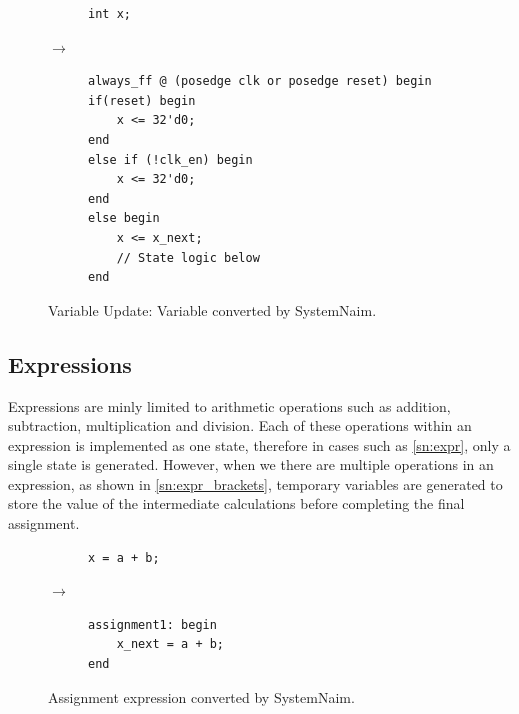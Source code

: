 \begin{figure}[H]
\centering
\begin{subfigure}{0.15\textwidth}
    \centering
    \begin{verbatim}
int x;
    \end{verbatim}
\end{subfigure}%
{\LARGE$\rightarrow$}%
\begin{subfigure}{0.45\textwidth}
    \begin{verbatim}
always_ff @ (posedge clk or posedge reset) begin
if(reset) begin
    x <= 32'd0;
end
else if (!clk_en) begin
    x <= 32'd0;
end
else begin
    x <= x_next;
    // State logic below
end
    \end{verbatim}
\end{subfigure}
\caption{Variable Update: Variable converted by SystemNaim.}
\label{sn:var_update}
\end{figure}

\subsection{Expressions}

Expressions are minly limited to arithmetic operations such as addition, subtraction, multiplication and division. Each of these operations within an expression is implemented as one state, therefore in cases such as \autoref{sn:expr}, only a single state is generated. However, when we there are multiple operations in an expression, as shown in \autoref{sn:expr_brackets}, temporary variables are generated to store the value of the intermediate calculations before completing the final assignment.

\begin{figure}[H]
\centering
\begin{subfigure}{0.2\textwidth}
    \centering
    \begin{verbatim}
x = a + b;
    \end{verbatim}
\end{subfigure}%
{\LARGE$\rightarrow$}%
\begin{subfigure}{0.3\textwidth}
    \begin{verbatim}
assignment1: begin
    x_next = a + b;
end
    \end{verbatim}
\end{subfigure}
\caption{Assignment expression converted by SystemNaim.}
\label{sn:expr}
\end{figure}

